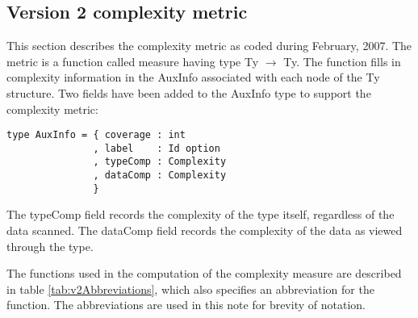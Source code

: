 \subsection{Version 2 complexity metric}

This section describes the complexity metric as coded during February,
2007. The metric is a function called \textsf{measure} having type
\textsf{Ty} $\rightarrow$ \textsf{Ty}. The function fills in complexity
information in the \textsf{AuxInfo} associated with each node of the
\textsf{Ty} structure. Two fields have been added to the \textsf{AuxInfo} type
to support the complexity metric:

\begin{verbatim}
type AuxInfo = { coverage : int
               , label    : Id option
               , typeComp : Complexity
               , dataComp : Complexity
               }
\end{verbatim}

The \textsf{typeComp} field records the complexity of the type itself,
regardless of the data scanned. The \textsf{dataComp} field records
the complexity of the data as viewed through the type.

The functions used in the computation of the complexity measure are
described in table \ref{tab:v2Abbreviations}, which also specifies an
abbreviation for the function. The abbreviations are used in this note
for brevity of notation.


